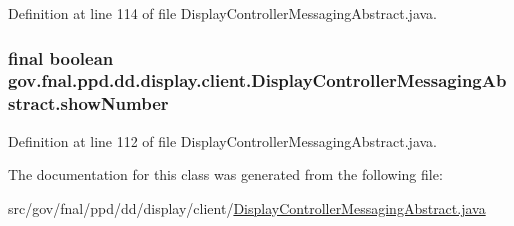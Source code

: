 Definition at line 114 of file Display\-Controller\-Messaging\-Abstract.\-java.

\hypertarget{classgov_1_1fnal_1_1ppd_1_1dd_1_1display_1_1client_1_1DisplayControllerMessagingAbstract_aca138d2835d0f3794bc86261ad550f18}{
\subsubsection[{show\-Number}]{\setlength{\rightskip}{0pt plus 5cm}final boolean gov.\-fnal.\-ppd.\-dd.\-display.\-client.\-Display\-Controller\-Messaging\-Abstract.\-show\-Number\hspace{0.3cm}{\ttfamily [protected]}}}\label{classgov_1_1fnal_1_1ppd_1_1dd_1_1display_1_1client_1_1DisplayControllerMessagingAbstract_aca138d2835d0f3794bc86261ad550f18}


Definition at line 112 of file Display\-Controller\-Messaging\-Abstract.\-java.



The documentation for this class was generated from the following file\-:\begin{DoxyCompactItemize}
\item 
src/gov/fnal/ppd/dd/display/client/\hyperlink{DisplayControllerMessagingAbstract_8java}{Display\-Controller\-Messaging\-Abstract.\-java}\end{DoxyCompactItemize}

